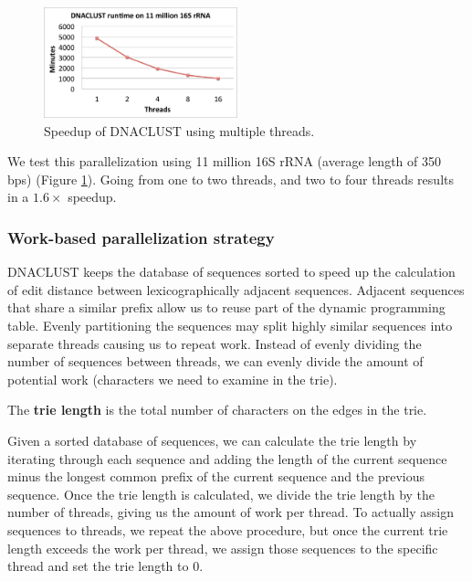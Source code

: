 \begin{figure}[tb]
  \centering
    \includegraphics[width=0.5\textwidth]{parallel}
  \caption{Speedup of DNACLUST using multiple threads.}
  \label{fig:parallel}
\end{figure}

We test this parallelization using 11 million 16S rRNA (average length of 350 bps) (Figure \ref{fig:parallel}).
Going from one to two threads, and two to four threads results in a $1.6\times$ speedup.

\subsubsection{Work-based parallelization strategy}

DNACLUST keeps the database of sequences sorted to speed up the calculation of edit distance between lexicographically adjacent sequences.
Adjacent sequences that share a similar prefix allow us to reuse part of the dynamic programming table.
Evenly partitioning the sequences may split highly similar sequences into separate threads causing us to repeat work.
Instead of evenly dividing the number of sequences between threads, we can evenly divide the amount of potential work (characters we need to examine in the trie).

\begin{definition}
The {\bf trie length} is the total number of characters on the edges in the trie.
\end{definition}

Given a sorted database of sequences, we can calculate the trie length by iterating through each sequence and adding the length of the current sequence minus the longest common prefix of the current sequence and the previous sequence.
Once the trie length is calculated, we divide the trie length by the number of threads, giving us the amount of work per thread.
To actually assign sequences to threads, we repeat the above procedure, but once the current trie length exceeds the work per thread, we assign those sequences to the specific thread and set the trie length to 0.

